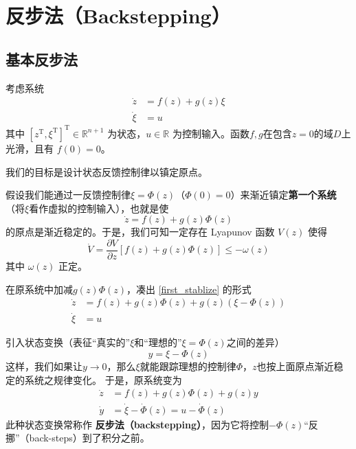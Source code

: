\section{反步法（Backstepping）}\label{5Dref}
\subsection{基本反步法}
考虑系统
\begin{equation}
    \begin{aligned}
  \dot{z} & = f (z) + g (z) \xi\\
  \dot{\xi} & = u
\end{aligned}\label{Sys:backstep:basic:original}
\end{equation}
其中 $[z^\mathrm{T}, \xi^\mathrm{T}]^\mathrm{T} \in \mathbb{R}^{n + 1}$ 为状态，$u \in
\mathbb{R}$ 为控制输入。函数$f, g$在包含$z = 0$的域$D$上光滑，且有 $f (0) = 0$。

我们的目标是设计状态反馈控制律以镇定原点。%

假设我们能通过一反馈控制律$\xi = \Phi (z)$（$\Phi (0) = 0$）来渐近镇定{\bf 第一个系统}（将$\xi$看作虚拟的控制输入），也就是使
\begin{equation}
    \dot{z} = f (z) + g (z) \Phi (z) \label{first_stablize}
\end{equation}
的原点是渐近稳定的。于是，我们可知一定存在 Lyapunov 函数 $V (z)$ 使得
\[ \dot{V} = \frac{\partial V}{\partial z} [f (z) + g (z) \Phi (z)] \leq -
   \omega (z) \]
其中 $\omega (z)$ 正定。

在原系统中加减$g (z) \Phi (z)$，凑出 \eqref{first_stablize} 的形式
\begin{equation}
   \begin{aligned}
  \dot{z} & = f (z) + g (z) \Phi (z) + g (z) (\xi - \Phi (z))\\
  \dot{\xi} & = u
\end{aligned} \label{Sys:backstep:basic:control}
\end{equation}

引入状态变换（表征“真实的”$\xi$和“理想的”$\xi=\Phi (z)$之间的差异）
\[ y = \xi - \Phi (z) \]
这样，我们如果让$y\to 0$，那么$\xi$就能跟踪理想的控制律$\Phi$，$z$也按上面原点渐近稳定的系统之规律变化。
于是，原系统变为
\begin{equation}
    \begin{aligned}
  \dot{z} & = f (z) + g (z) \Phi (z) + g (z) y\\
  \dot{y} & = \dot{\xi}-\dot{\Phi} (z) = u - \dot{\Phi} (z)
\end{aligned}\label{Sys:backstep:basic:backstep}
\end{equation}
此种状态变换常称作 {\textbf{反步法（backstepping）}}，因为它将控制$- \Phi (z)$“反挪”（back-steps）到了积分之前。

